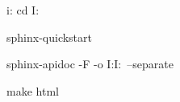 i:
cd I:\GoogleDrive\git\ShaderIO\ShaderIO\docs

sphinx-quickstart


sphinx-apidoc -F -o I:\GoogleDrive\git\ShaderIO\ShaderIO\docs I:\GoogleDrive\git\ShaderIO\ShaderIO\ShaderIO\ --separate

make html